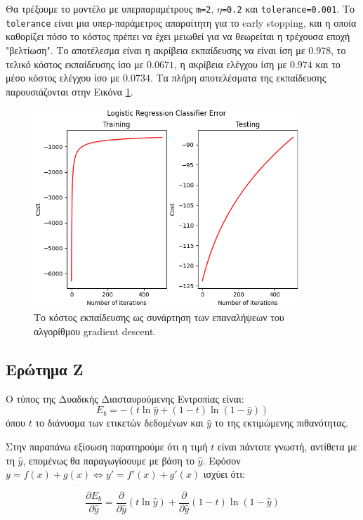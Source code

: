 \documentclass{article}
\newcommand{\code}{\texttt}
\begin{document}
Θα τρέξουμε το μοντέλο με υπερπαραμέτρους \code{m=2}, \code{$\eta$=0.2} και \code{tolerance=0.001}. Το \code{tolerance} είναι μια υπερ-παράμετρος απαραίτητη για το early stopping, και η οποία καθορίζει πόσο το κόστος πρέπει να έχει μειωθεί για να θεωρείται η τρέχουσα εποχή "βελτίωση". Το αποτέλεσμα είναι η ακρίβεια εκπαίδευσης να είναι ίση με $0.978$, το τελικό κόστος εκπαίδευσης ίσο με $0.0671$, η ακρίβεια ελέγχου ίση με $0.974$ και το μέσο κόστος ελέγχου ίσο με $0.0734$. Τα πλήρη αποτελέσματα της εκπαίδευσης παρουσιάζονται στην Εικόνα \ref{mlp_train_test}.

\begin{figure}
	\includegraphics[width=10cm]{mlp_error.png}
	\centering
	\caption{Το κόστος εκπαίδευσης ως συνάρτηση των επαναλήψεων του αλγορίθμου gradient descent.}
	\label{mlp_train_test}
\end{figure}


\subsection{Ερώτημα Ζ}

Ο τύπος της Δυαδικής Διασταυρούμενης Εντροπίας είναι:
\begin{equation}
	\label{eq:1}
	E_{b} = -(t \ln \hat{y} + (1-t) \ln(1-\hat{y}))
\end{equation}
όπου $t$ το διάνυσμα των ετικετών δεδομένων και $\hat{y}$ το της εκτιμώμενης πιθανότητας.

Στην παραπάνω εξίσωση παρατηρούμε ότι η τιμή $t$ είναι πάντοτε γνωστή, αντίθετα με τη $\hat{y}$, επομένως θα παραγωγίσουμε με βάση το $\hat{y}$. Εφόσον $y = f(x) + g(x) \iff y' = f'(x) + g'(x)$ ισχύει ότι:

\begin{equation}
	\label{eq:2}
	\frac{\partial E_b}{\partial \hat{y}} = \frac{\partial}{\partial \hat{y}} (t\ln \hat{y}) + \frac{\partial}{\partial \hat{y}} (1-t) \ln (1-\hat{y})
\end{equation}
\end{document}
